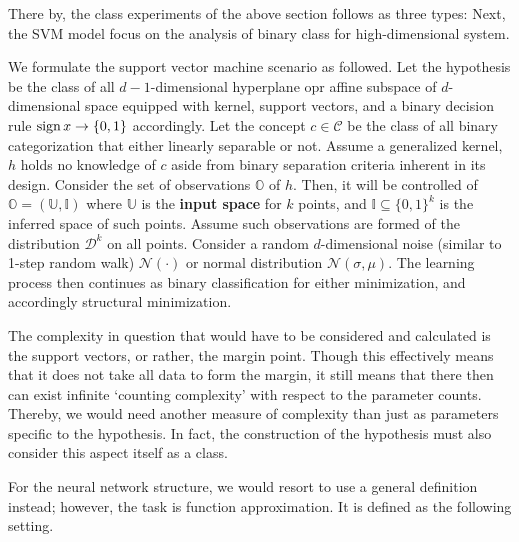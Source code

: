 \documentclass[10pt,oneside,oldfontcommands,dvipsnames,article]{memoir}
\begin{document}
There by, the class experiments of the above section follows as three types: 
\vspace{2mm}
Next, the SVM model focus on the analysis of binary class for high-dimensional system. 
\vspace{2mm}
\begin{setting}
    We formulate the support vector machine scenario as followed. Let the hypothesis be the class of all $d-1$-dimensional hyperplane opr affine subspace of $d$-dimensional space equipped with kernel, support vectors, and a binary decision rule $\operatorname{sign}{x}\to \{0,1\}$ accordingly. Let the concept $c\in \mathcal{C}$ be the class of all binary categorization that either linearly separable or not. Assume a generalized kernel, $h$ holds no knowledge of $c$ aside from binary separation criteria inherent in its design. Consider the set of observations $\mathbb{O}$ of $h$. Then, it will be controlled of $\mathbb{O}=(\mathbb{U},\mathbb{I})$ where $\mathbb{U}$ is the \textbf{input space} for $k$ points, and $\mathbb{I}\subseteq \{0,1\}^{k}$ is the inferred space of such points. Assume such observations are formed of the distribution $\mathcal{D}^{k}$ on all points. Consider a random $d$-dimensional noise (similar to 1-step random walk) $\mathcal{N}(\cdot)$ or normal distribution $\mathcal{N}(\sigma, \mu)$. The learning process then continues as binary classification for either minimization, and accordingly structural minimization. 
\end{setting}
The complexity in question that would have to be considered and calculated is the support vectors, or rather, the margin point. Though this effectively means that it does not take all data to form the margin, it still means that there then can exist infinite `counting complexity' with respect to the parameter counts. Thereby, we would need another measure of complexity than just as parameters specific to the hypothesis. In fact, the construction of the hypothesis must also consider this aspect itself as a class. 

For the neural network structure, we would resort to use a general definition instead; however, the task is function approximation. It is defined as the following setting. 
\vspace{2mm}
\end{document}
